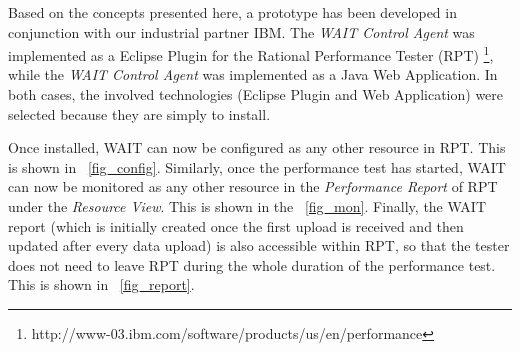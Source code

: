 \documentclass[runningheads,a4paper]{llncs}
\begin{document}
Based on the concepts presented here, a prototype has been developed in
conjunction with our industrial partner IBM. The \emph{WAIT Control Agent} was
implemented as a Eclipse Plugin for the Rational Performance Tester (RPT)
\footnote{http://www-03.ibm.com/software/products/us/en/performance},
while the \emph{WAIT Control Agent} was implemented as a Java Web Application.
In both cases, the involved technologies (Eclipse Plugin and Web Application)
were selected because they are simply to install.

Once installed, WAIT can now be configured as any other resource in RPT. This is
shown in \figurename ~\ref{fig_config}. Similarly, once the performance test has started, WAIT can now be monitored as any other resource in the
\emph{Performance Report} of RPT under the \emph{Resource View}. This is shown
in the \figurename ~\ref{fig_mon}. Finally, the WAIT report (which is initially created 
once the first upload is received and then updated after every data
upload) is also accessible within RPT, so that the tester does not need to
leave RPT during the whole duration of the performance test. This is shown
in \figurename ~\ref{fig_report}.
\vspace{-5pt}
\end{document}
